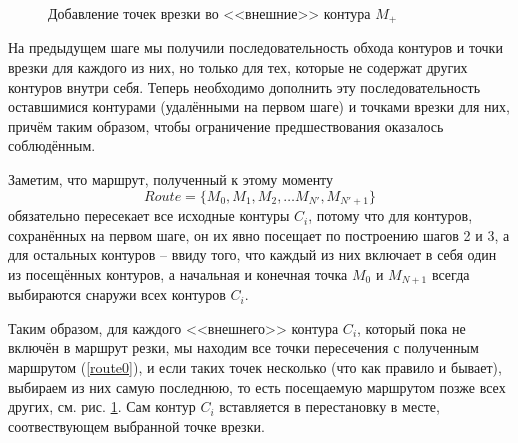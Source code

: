\documentclass[10pt]{SPIIRAS_Proceedings}
\begin{document}
\begin{figure}
  \centering
  \caption{Добавление точек врезки во <<внешние>> контура $M_+$}
  \label{extra-pierce-point}
\end{figure}

На предыдущем шаге мы получили
последовательность обхода контуров
и точки врезки для каждого из них,
но только для тех,
которые не содержат других контуров внутри себя.
Теперь необходимо дополнить эту последовательность
оставшимися контурами
(удалёнными на первом шаге)
и точками врезки для них,
причём таким образом,
чтобы ограничение предшествования
оказалось соблюдённым.

Заметим, что маршрут,
полученный к этому моменту
\begin{equation}
Route = \{ M_0, M_1, M_2, \dots M_{N'}, M_{N'+1}\}
\label{route0}
\end{equation}
обязательно пересекает все исходные контуры
$C_i$,
потому что для контуров,
сохранённых на первом шаге,
он их явно посещает
по построению шагов 2 и 3,
а для остальных контуров --
ввиду того, что
каждый из них включает в себя
один из посещённых контуров,
а начальная и конечная точка
$M_0$
и
$M_{N + 1}$
всегда выбираются снаружи всех контуров
$C_i$.

Таким образом,
для каждого
<<внешнего>> контура
$C_i$,
который пока не включён в маршрут резки,
мы находим все точки пересечения
с полученным маршрутом
(\ref{route0}),
и если таких точек несколько
(что как правило и бывает),
выбираем из них самую последнюю,
то есть посещаемую маршрутом позже всех
других,
см. рис. \ref{extra-pierce-point}.
Сам контур
$C_i$
вставляется в перестановку
в месте,
соотвествующем выбранной точке врезки.
\end{document}
